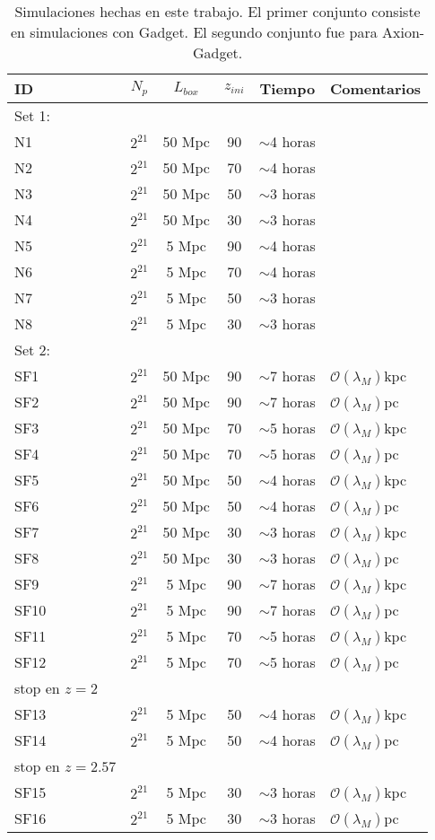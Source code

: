 \documentclass[a4paper,openright,12pt]{book}
\begin{document}
\begin{table}[]
\caption{Simulaciones hechas en este trabajo. El primer conjunto consiste en simulaciones con Gadget. El segundo conjunto fue para Axion-Gadget.}
\label{Tabla 4.3}\centering%
\begin{tabular}{lccccl}
\toprule%
ID&$N_{p}$&$L_{box}$&$z_{ini}$&Tiempo&Comentarios\\\toprule%
Set 1:\\
N1&$2^{21}$&50 Mpc&90&$\sim$4 horas&\\
N2&$2^{21}$&50 Mpc&70&$\sim$4 horas\\
N3&$2^{21}$&50 Mpc&50&$\sim$3 horas\\
N4&$2^{21}$&50 Mpc&30&$\sim$3 horas\\
N5&$2^{21}$&5 Mpc&90&$\sim$4 horas\\
N6&$2^{21}$&5 Mpc&70&$\sim$4 horas\\
N7&$2^{21}$&5 Mpc&50&$\sim$3 horas\\
N8&$2^{21}$&5 Mpc&30&$\sim$3 horas\\\midrule
Set 2:\\
SF1&$2^{21}$&50 Mpc&90&$\sim$7 horas&$\mathcal{O}(\lambda_{M})$kpc\\
SF2&$2^{21}$&50 Mpc&90&$\sim$7 horas&$\mathcal{O}(\lambda_{M})$pc\\
SF3&$2^{21}$&50 Mpc&70&$\sim$5 horas&$\mathcal{O}(\lambda_{M})$kpc\\
SF4&$2^{21}$&50 Mpc&70&$\sim$5 horas&$\mathcal{O}(\lambda_{M})$pc\\
SF5&$2^{21}$&50 Mpc&50&$\sim$4 horas&$\mathcal{O}(\lambda_{M})$kpc\\
SF6&$2^{21}$&50 Mpc&50&$\sim$4 horas&$\mathcal{O}(\lambda_{M})$pc\\
SF7&$2^{21}$&50 Mpc&30&$\sim$3 horas&$\mathcal{O}(\lambda_{M})$kpc\\
SF8&$2^{21}$&50 Mpc&30&$\sim$3 horas&$\mathcal{O}(\lambda_{M})$pc\\
SF9&$2^{21}$&5 Mpc&90&$\sim$7 horas&$\mathcal{O}(\lambda_{M})$kpc\\
SF10&$2^{21}$&5 Mpc&90&$\sim$7 horas&$\mathcal{O}(\lambda_{M})$pc\\
SF11&$2^{21}$&5 Mpc&70&$\sim$5 horas&$\mathcal{O}(\lambda_{M})$kpc\\\midrule
SF12&$2^{21}$&5 Mpc&70&$\sim$5 horas&$\mathcal{O}(\lambda_{M})$pc\\stop en $z = 2$\\\midrule
SF13&$2^{21}$&5 Mpc&50&$\sim$4 horas&$\mathcal{O}(\lambda_{M})$kpc\\\midrule
SF14&$2^{21}$&5 Mpc&50&$\sim$4 horas&$\mathcal{O}(\lambda_{M})$pc\\stop en $z = 2.57$\\\midrule
SF15&$2^{21}$&5 Mpc&30&$\sim$3 horas&$\mathcal{O}(\lambda_{M})$kpc\\
SF16&$2^{21}$&5 Mpc&30&$\sim$3 horas&$\mathcal{O}(\lambda_{M})$pc\\\bottomrule









\end{tabular}
\end{table}
\end{document}
